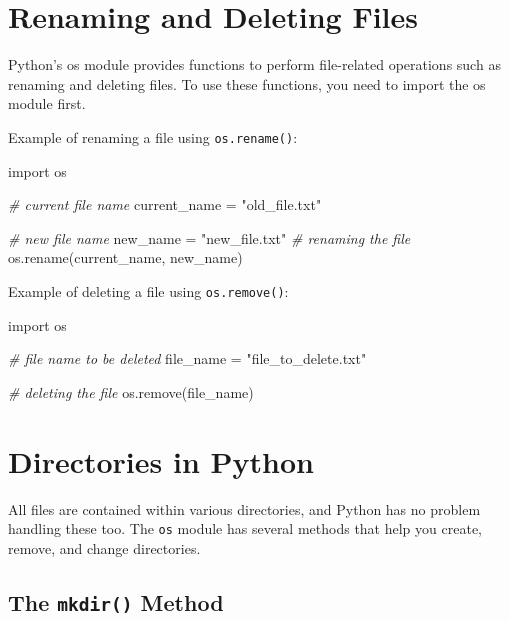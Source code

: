\documentclass[11pt]{article}
\newenvironment{Shaded}{}{}
\newcommand{\StringTok}[1]{\textcolor[rgb]{0.25,0.44,0.63}{{#1}}}
\newcommand{\CommentTok}[1]{\textcolor[rgb]{0.38,0.63,0.69}{\textit{{#1}}}}
\newcommand{\NormalTok}[1]{{#1}}
\newcommand{\ImportTok}[1]{{#1}}
\newcommand{\OperatorTok}[1]{\textcolor[rgb]{0.40,0.40,0.40}{{#1}}}
\begin{document}
\hypertarget{renaming-and-deleting-files}{%
\section{Renaming and Deleting
Files}\label{renaming-and-deleting-files}}

Python's os module provides functions to perform file-related operations
such as renaming and deleting files. To use these functions, you need to
import the os module first.

Example of renaming a file using \texttt{os.rename()}:

\begin{Shaded}
\begin{Highlighting}[]
\ImportTok{import}\NormalTok{ os}

\CommentTok{\# current file name}
\NormalTok{current\_name }\OperatorTok{=} \StringTok{"old\_file.txt"}

\CommentTok{\# new file name}
\NormalTok{new\_name }\OperatorTok{=} \StringTok{"new\_file.txt"}
\CommentTok{\# renaming the file}
\NormalTok{os.rename(current\_name, new\_name)}
\end{Highlighting}
\end{Shaded}

Example of deleting a file using \texttt{os.remove()}:

\begin{Shaded}
\begin{Highlighting}[]
\ImportTok{import}\NormalTok{ os}

\CommentTok{\# file name to be deleted}
\NormalTok{file\_name }\OperatorTok{=} \StringTok{"file\_to\_delete.txt"}

\CommentTok{\# deleting the file}
\NormalTok{os.remove(file\_name)}
\end{Highlighting}
\end{Shaded}

\hypertarget{directories-in-python}{%
\section{Directories in Python}\label{directories-in-python}}

All files are contained within various directories, and Python has no
problem handling these too. The \texttt{os} module has several methods
that help you create, remove, and change directories.

\hypertarget{the-mkdir-method}{%
\subsection{\texorpdfstring{The \texttt{mkdir()}
Method}{The mkdir() Method}}\label{the-mkdir-method}}
\end{document}
